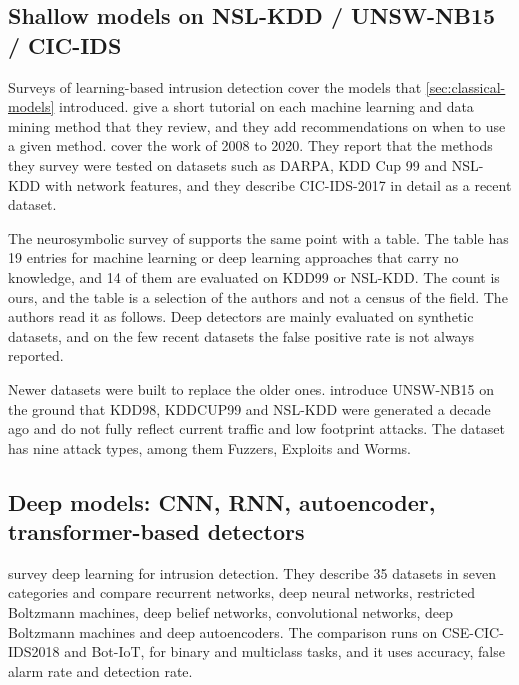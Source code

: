 \subsection{Shallow models on NSL-KDD / UNSW-NB15 / CIC-IDS}
\label{sec:shallow-nids}

Surveys of learning-based intrusion detection cover the models that
\cref{sec:classical-models} introduced. \citet{buczak2016survey} give a short
tutorial on each machine learning and data mining method that they review, and
they add recommendations on when to use a given method.
\citet{thakkar2022survey} cover the work of 2008 to 2020. They report that the
methods they survey were tested on datasets such as DARPA, KDD Cup 99 and
NSL-KDD with network features, and they describe CIC-IDS-2017 in detail as a
recent dataset.

The neurosymbolic survey of \citet{bizzarri2025survey} supports the same point
with a table. The table has 19 entries for machine learning or deep learning
approaches that carry no knowledge, and 14 of them are evaluated on KDD99 or
NSL-KDD. The count is ours, and the table is a selection of the authors and not
a census of the field. The authors read it as follows. Deep detectors are
mainly evaluated on synthetic datasets, and on the few recent datasets the
false positive rate is not always reported.

Newer datasets were built to replace the older ones.
\citet{moustafa2015unswnb15} introduce UNSW-NB15 on the ground that KDD98,
KDDCUP99 and NSL-KDD were generated a decade ago and do not fully reflect
current traffic and low footprint attacks. The dataset has nine attack types,
among them Fuzzers, Exploits and Worms.

\subsection[Deep models: CNN, RNN, autoencoder, transformer-based detectors]{Deep models: CNN, RNN, autoencoder,\\ transformer-based detectors}
\label{sec:deep-nids}

\citet{ferrag2020deep} survey deep learning for intrusion detection. They
describe 35 datasets in seven categories and compare recurrent networks, deep
neural networks, restricted Boltzmann machines, deep belief networks,
convolutional networks, deep Boltzmann machines and deep autoencoders. The
comparison runs on CSE-CIC-IDS2018 and Bot-IoT, for binary and multiclass
tasks, and it uses accuracy, false alarm rate and detection rate.

